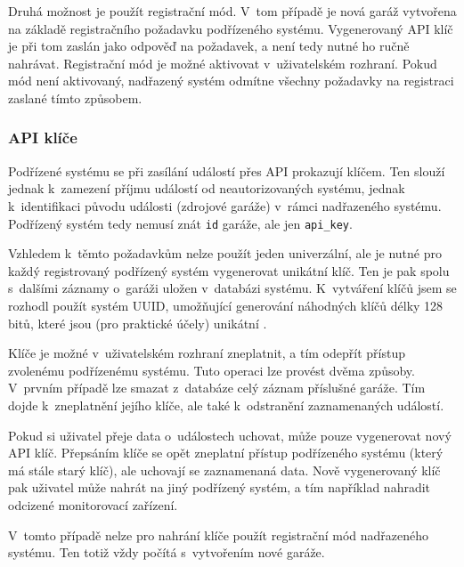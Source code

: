 Druhá možnost je použít registrační mód. V~tom případě je nová garáž vytvořena na základě registračního požadavku podřízeného systému. Vygenerovaný API klíč je při tom zaslán jako odpověď na požadavek, a není tedy nutné ho ručně nahrávat. Registrační mód je možné aktivovat v~uživatelském rozhraní. Pokud mód není aktivovaný, nadřazený systém odmítne všechny požadavky na registraci zaslané tímto způsobem.

\subsubsection{API klíče}
\label{sec:de_apikeys}

Podřízené systému se při zasílání událostí přes API prokazují klíčem. Ten slouží jednak k~zamezení příjmu událostí od neautorizovaných systému, jednak k~identifikaci původu události (zdrojové garáže) v~rámci nadřazeného systému. Podřízený systém tedy nemusí znát \texttt{id} garáže, ale jen \texttt{api\_key}.

Vzhledem k~těmto požadavkům nelze použít jeden univerzální, ale je nutné pro každý registrovaný podřízený systém vygenerovat unikátní klíč. Ten je pak spolu s~dalšími záznamy o~garáži uložen v~databázi systému. K~vytváření klíčů jsem se rozhodl použít systém UUID, umožňující generování náhodných klíčů délky 128 bitů, které jsou (pro praktické účely) unikátní \cite{rfc4122}.


Klíče je možné v~uživatelském rozhraní zneplatnit, a tím odepřít přístup zvolenému podřízenému systému. Tuto operaci lze provést dvěma způsoby. V~prvním případě lze smazat z~databáze celý záznam příslušné garáže. Tím dojde k~zneplatnění jejího klíče, ale také k~odstranění zaznamenaných událostí.

Pokud si uživatel přeje data o~událostech uchovat, může pouze vygenerovat nový API klíč. Přepsáním klíče se opět zneplatní přístup podřízeného systému (který má stále starý klíč), ale uchovají se zaznamenaná data. Nově vygenerovaný klíč pak uživatel může nahrát na jiný podřízený systém, a tím například nahradit odcizené monitorovací zařízení. 

V~tomto případě nelze pro nahrání klíče použít registrační mód nadřazeného systému. Ten totiž vždy počítá s~vytvořením nové garáže.

